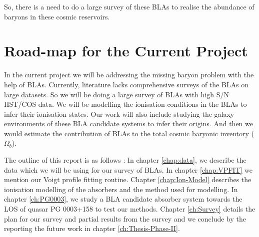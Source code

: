 So, there is a need to do a large survey of these BLAs to realise the abundance of baryons in these cosmic reservoirs. 

\section{Road-map for the Current Project}

In the current project we will be addressing the missing baryon problem with the help of BLAs. Currently, literature lacks comprehensive surveys of the BLAs on large datasets. So we will be doing a large survey of BLAs with high S/N HST/COS data. We will be modelling the ionisation conditions in the BLAs to infer their ionisation states. Our work will also include studying the galaxy environments of these BLA candidate systems to infer their origins. And then we would estimate the contribution of BLAs to the total cosmic baryonic inventory ($\Omega_b$). 

The outline of this report is as follows : In chapter \ref{chap:data}, we describe the data which we will be using for our survey of BLAs. In chapter \ref{chap:VPFIT} we mention our Voigt profile fitting routine. Chapter \ref{chap:Ion-Model} describes the ionisation modelling of the absorbers and the method used for modelling. In chapter \ref{ch:PG0003}, we study a BLA candidate absorber system towards the LOS of quasar PG 0003+158 to test our methods. Chapter \ref{ch:Survey} details the plan for our survey and partial results from the survey and we conclude by the reporting the future work in chapter \ref{ch:Thesis-Phase-II}. 

